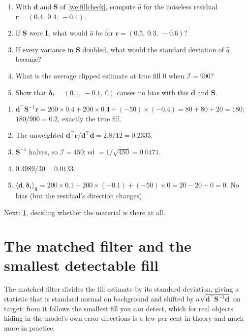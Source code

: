 \documentclass[11pt,a4paper,oneside,openany]{book}
\newcommand{\B}[1]{{\symbf{#1}}}
\newcommand{\B}[1]{{\bm{#1}}}
\newcommand{\T}{^{\top}}
\newcommand{\vr}{\B{r}}
\newcommand{\vd}{\B{d}}
\newcommand{\vdelta}{\B{\delta}}
\newcommand{\mS}{\B{S}}
\newcommand{\mI}{\B{I}}
\newcommand{\ahat}{\hat a}
\newcommand{\nextchapter}[1]{\par\medskip\noindent\hfill\textsf{\small Next: #1}\par}
\begin{document}
\begin{checkyourself}
\begin{enumerate}
\item With $\vd$ and $\mS$ of \cref{we:fillcheck}, compute $\ahat$ for the noiseless residual $\vr=(0.4,\ 0.4,\ -0.4)$.
\item If $\mS$ were $\mI$, what would $\ahat$ be for $\vr=(0.5,\ 0.3,\ -0.6)$?
\item If every variance in $\mS$ doubled, what would the standard deviation of $\ahat$ become?
\item What is the average clipped estimate at true fill 0 when $\mathcal I=900$?
\item Show that $\vdelta_t=(0.1,\ -0.1,\ 0)$ causes no bias with this $\vd$ and $\mS$.
\end{enumerate}
\end{checkyourself}

\begin{answers}
\begin{enumerate}
\item $\vd\T\mS^{-1}\vr=200\times0.4+200\times0.4+(-50)\times(-0.4)=80+80+20=180$; $180/900=0.2$, exactly the true fill.
\item The unweighted $\vd\T\vr/\vd\T\vd=2.8/12=0.2333$.
\item $\mS^{-1}$ halves, so $\mathcal I=450$; sd $=1/\sqrt{450}=0.0471$.
\item $0.3989/30=0.0133$.
\item $\langle\vd,\vdelta_t\rangle_{\mS}=200\times0.1+200\times(-0.1)+(-50)\times0=20-20+0=0$. No bias (but the residual's direction changes).
\end{enumerate}
\end{answers}

\nextchapter{\cref{ch:mf}, deciding whether the material is there at all.}

\chapter{The matched filter and the smallest detectable fill}
\label{ch:mf}

\begin{onething}
The matched filter divides the fill estimate by its standard deviation, giving a statistic that is standard normal on background and shifted
by $a\sqrt{\vd\T\mS^{-1}\vd}$ on target; from it follows the smallest fill you can detect, which for real objects hiding in the model's own error
directions is a few per cent in theory and much more in practice.
\end{onething}
\end{document}
